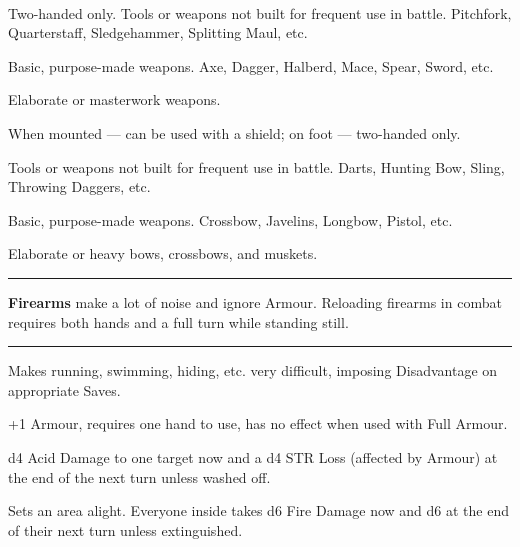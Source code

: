 \documentclass[itdr]{subfiles}
\begin{document}

\\Two-handed only. Tools or weapons not built for frequent use in battle. Pitchfork, Quarterstaff, Sledgehammer, Splitting Maul, etc.

 Basic, purpose-made weapons. Axe, Dagger, Halberd, Mace, Spear, Sword, etc.

 Elaborate or masterwork weapons.

 When mounted --- can be used with a shield; on foot --- two-handed only.

\vfill


 Tools or weapons not built for frequent use in battle. Darts, Hunting Bow, Sling, Throwing Daggers, etc.

 Basic, purpose-made weapons. Crossbow, Javelins, Longbow, Pistol, etc.

 Elaborate or heavy bows, crossbows, and muskets.

\vfill\hrule
{}
\textbf{Firearms} make a lot of noise and ignore Armour. Reloading firearms in combat requires both hands and a full turn while standing still.
\hrule\vfill



 Makes running, swimming, hiding, etc. very difficult, imposing Disadvantage on appropriate Saves.

 +1 Armour, requires one hand to use, has no effect when used with Full Armour.

\break


 d4 Acid Damage to one target now and a d4 STR Loss (affected by Armour) at the end of the next turn unless washed off.

 Sets an area alight. Everyone inside takes d6 Fire Damage now and d6 at the end of their next turn unless extinguished.
\end{document}
